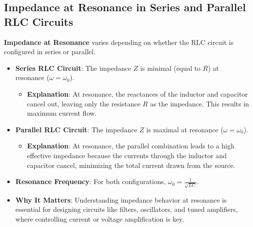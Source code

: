 \documentclass[12pt]{article}
\newcommand{\concept}[1]{\textbf{#1}}
\begin{document}
\subsection{Impedance at Resonance in Series and Parallel RLC Circuits}
\concept{Impedance at Resonance} varies depending on whether the RLC circuit is configured in series or parallel.
\begin{itemize}
    \item \textbf{Series RLC Circuit}: The impedance \(Z\) is minimal (equal to \(R\)) at resonance (\(\omega = \omega_0\)).
        \begin{itemize}
            \item \textbf{Explanation}: At resonance, the reactances of the inductor and capacitor cancel out, leaving only the resistance \(R\) as the impedance. This results in maximum current flow.
        \end{itemize}
    \item \textbf{Parallel RLC Circuit}: The impedance \(Z\) is maximal at resonance (\(\omega = \omega_0\)).
        \begin{itemize}
            \item \textbf{Explanation}: At resonance, the parallel combination leads to a high effective impedance because the currents through the inductor and capacitor cancel, minimizing the total current drawn from the source.
        \end{itemize}
    \item \textbf{Resonance Frequency}: For both configurations, \(\omega_0 = \frac{1}{\sqrt{L C}}\).
    \item \textbf{Why It Matters}: Understanding impedance behavior at resonance is essential for designing circuits like filters, oscillators, and tuned amplifiers, where controlling current or voltage amplification is key.
\end{itemize}
\end{document}
